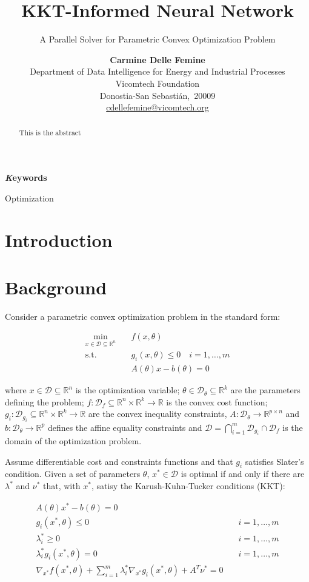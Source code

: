 \documentclass[
]{article}
\title{KKT-Informed Neural Network}
\subtitle{A Parallel Solver for Parametric Convex Optimization Problem}
\author{\textbf{Carmine Delle Femine}\\Department of Data Intelligence
for Energy and Industrial Processes\\Vicomtech Foundation\\Donostia-San
Sebastián,\ 20009\\\href{mailto:cdellefemine@vicomtech.org}{cdellefemine@vicomtech.org}}
\date{}
\begin{document}
\maketitle
\begin{abstract}
This is the abstract
\end{abstract}
{\bfseries \emph Keywords}
\def\sep{\textbullet\ }

Optimization


\section{Introduction}\label{introduction}

\section{Background}\label{background}

Consider a parametric convex optimization problem in the standard form:

\[
\begin{aligned}
\min_{x \in \mathcal{D} \subseteq\mathbb{R}^n} \quad &f(x, {\theta})\\
\textrm{s.t.} \quad & g_i(x, \theta) \leq 0 \quad i = 1, \dots, m \\
& A(\theta) x - b(\theta) = 0
\end{aligned}
\]

where \(x \in \mathcal{D} \subseteq\mathbb{R}^n\) is the optimization
variable; \(\theta \in \mathcal{D}_\theta \subseteq \mathbb{R}^k\) are
the parameters defining the problem;
\(f: \mathcal{D}_f \subseteq\mathbb{R}^n \times \mathbb{R}^k \to \mathbb{R}\)
is the convex cost function;
\(g_i: \mathcal{D}_{g_i} \subseteq\mathbb{R}^n \times \mathbb{R}^k \to \mathbb{R}\)
are the convex inequality constraints,
\(A: \mathcal{D}_\theta \to \mathbb{R}^{p \times n}\) and
\(b: \mathcal{D}_\theta \to \mathbb{R}^{p}\) defines the affine equality
constraints and
\(\mathcal{D} = \bigcap_{i=1}^{m} \mathcal{D}_{g_i} \cap \mathcal{D}_{f}\)
is the domain of the optimization problem.

Assume differentiable cost and constraints functions and that \(g_i\)
satisfies Slater's condition. Given a set of parameters \(\theta\),
\(x^* \in \mathcal{D}\) is optimal if and only if there are
\(\lambda^*\) and \(\nu^*\) that, with \(x^*\), satisy the
Karush-Kuhn-Tucker conditions (KKT):

\begin{align}
    A(\theta) x^* - b(\theta) = 0&\\
    g_i(x^*, \theta) \leq 0& \quad i=1,\dots, m\\
    \lambda_i^* \geq 0& \quad i=1,\dots, m\\
    \lambda_i^* g_i(x^*, \theta) = 0& \quad i=1,\dots, m\\
    \nabla_{x^*} f(x^*, \theta) + \sum\nolimits_{i=1}^m \lambda^*_i\nabla_{x^*} g_i(x^*, \theta) + A^T\nu^* = 0 &
\end{align}
\end{document}
